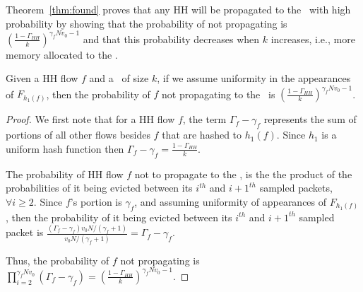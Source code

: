 Theorem~\ref{thm:found} proves that any HH will be propagated to the \cs\ with high probability by showing that the probability of not propagating is
$(\frac{1-\Gamma_{HH}}{k})^{\gamma_f N v_0-1}$ and that this probability decreases when $k$ increases, i.e., more memory allocated to the \sfa.

\begin{theorem}
\label{thm:found}
Given a HH flow $f$ and a \sfa\ of size $k$, if we assume uniformity in the appearances of $F_{h_1(f)}$, then the probability of $f$ not propagating to the \cs\ is $(\frac{1-\Gamma_{HH}}{k})^{\gamma_f N v_0-1}$.
\end{theorem}

\begin{proof}
We first note that for a HH flow $f$, the term $\Gamma_f-\gamma_f$ represents the sum of portions of all other flows besides $f$ that are hashed to $h_1(f)$. Since $h_1$ is a uniform hash function then $\Gamma_f-\gamma_f = \frac{1-\Gamma_{HH}}{k}$.

The probability of HH flow $f$ not to propagate to the \cs, is the the product of the probabilities of it being evicted between its $i^{th}$ and $i+1^{th}$ sampled packets, $\forall i\geq 2$. Since $f$'s portion is $\gamma_f$, and assuming uniformity of appearances of $F_{h_1(f)}$, then the probability of it being evicted between its $i^{th}$ and $i+1^{th}$ sampled packet is $\frac{(\Gamma_f-\gamma_f) v_0 N / (\gamma_f + 1)}{v_0 N / (\gamma_f + 1)} = \Gamma_f-\gamma_f$.

Thus, the probability of $f$ not propagating is $\prod^{\gamma_f N v_0}_{i=2} (\Gamma_f - \gamma_f) = (\frac{1-\Gamma_{HH}}{k})^{\gamma_f N v_0 -1}$.
\end{proof}

